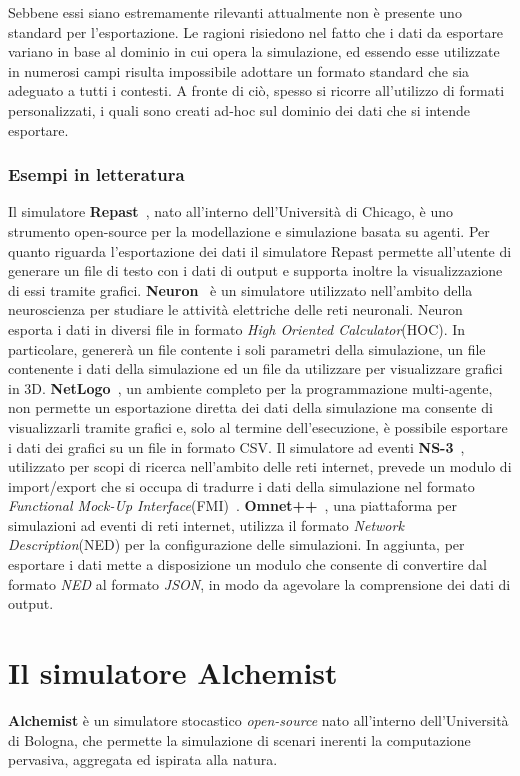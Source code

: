 \documentclass[12pt,a4paper,openright,oneside]{book}
\begin{document}
Sebbene essi siano estremamente rilevanti attualmente non è presente uno standard per l'esportazione.
Le ragioni risiedono nel fatto che i dati da esportare variano in base al dominio in cui opera la simulazione, ed essendo esse utilizzate in numerosi campi risulta impossibile adottare un formato standard che sia adeguato a tutti i contesti.
A fronte di ciò, spesso si ricorre all'utilizzo di formati personalizzati, i quali sono creati ad-hoc sul dominio dei dati che si intende esportare.

\subsection{Esempi in letteratura}
Il simulatore \textbf{Repast}~\cite{repast}, nato all'interno dell'Università di Chicago, è uno strumento open-source per la modellazione e simulazione basata su agenti. Per quanto riguarda l'esportazione dei dati il simulatore Repast permette all'utente di generare un file di testo con i dati di output e supporta inoltre la visualizzazione di essi tramite grafici.
\textbf{Neuron}~\cite{kumbhar2019coreneuron} è un simulatore utilizzato nell'ambito della neuroscienza per studiare le attività elettriche delle reti neuronali. Neuron esporta i dati in diversi file in formato \textit{High Oriented Calculator}(HOC). In particolare, genererà un file contente i soli parametri della simulazione, un file contenente i dati della simulazione ed un file da utilizzare per visualizzare grafici in 3D. \textbf{NetLogo}~\cite{netlogo}, un ambiente completo per la programmazione multi-agente, non permette un esportazione diretta dei dati della simulazione ma consente di visualizzarli tramite grafici e, solo al termine dell'esecuzione, è possibile esportare i dati dei grafici su un file in formato CSV. Il simulatore ad eventi \textbf{NS-3}~\cite{ns3}, utilizzato per scopi di ricerca nell'ambito delle reti internet, prevede un modulo di import/export che si occupa di tradurre i dati della simulazione nel formato \textit{Functional Mock-Up Interface}(FMI)~\cite{fmi}.
\textbf{Omnet++}~\cite{omnet}, una piattaforma per simulazioni ad eventi di reti internet, utilizza il formato \textit{Network Description}(NED) per la configurazione delle simulazioni. In aggiunta, per esportare i dati mette a disposizione un modulo che consente di convertire dal formato \textit{NED} al formato \textit{JSON}, in modo da agevolare la comprensione dei dati di output. 

\chapter{Il simulatore Alchemist}
\textbf{Alchemist} è un simulatore stocastico \textit{open-source} nato all’interno dell’Università di Bologna, che permette la simulazione di scenari inerenti la computazione pervasiva, aggregata ed ispirata alla natura.
\end{document}
